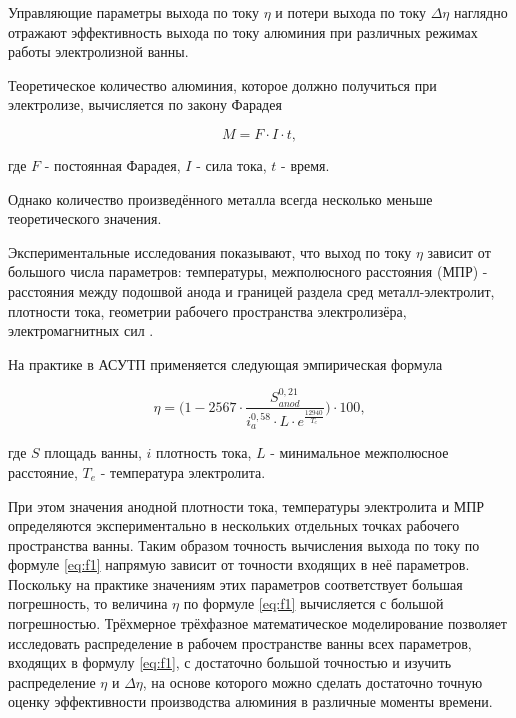 \documentclass[]{pmi}
\begin{document}

Управляющие параметры выхода по току $\eta$ и потери выхода по току $\Delta \eta$ наглядно отражают эффективность выхода по току алюминия при различных режимах работы электролизной ванны.

Теоретическое количество алюминия, которое должно получиться при электролизе, вычисляется по закону Фарадея

\begin{equation}\label{eq:farad}
M = F \cdot I \cdot t,
\end{equation}

где $F$ - постоянная Фарадея, $I$ - сила тока, $t$ - время.

Однако количество произведённого металла всегда несколько меньше теоретического значения.

Экспериментальные исследования показывают, что выход по току $\eta$ зависит от большого числа параметров: температуры, межполюсного расстояния (МПР) - расстояния между подошвой анода и границей раздела сред металл-электролит, плотности тока, геометрии рабочего пространства электролизёра, электромагнитных сил \cite{litlink:belo}.

На практике в АСУТП применяется следующая эмпирическая формула \cite{litlink:derkach2}

\begin{equation}\label{eq:f1}
\eta = \bigg(1-2567 \cdot \frac{S^{0,21}_{anod}}{i^{0,58}_{a}\cdot L \cdot e^{\frac{12940}{T_e}}}\bigg) \cdot 100,
\end{equation}

где $S$ площадь ванны, $i$ плотность тока, $L$ - минимальное межполюсное расстояние, $T_e$ - температура электролита.

При этом значения анодной плотности тока, температуры электролита и МПР определяются экспериментально в нескольких отдельных точках рабочего пространства ванны.
Таким образом точность вычисления выхода по току по формуле \ref{eq:f1} напрямую зависит от точности входящих в неё параметров. Поскольку на практике значениям этих параметров соответствует большая погрешность, то величина $\eta$ по формуле \ref{eq:f1} вычисляется с большой погрешностью. Трёхмерное трёхфазное математическое моделирование \cite{litlink:kalmykov} позволяет исследовать распределение в рабочем пространстве ванны всех параметров, входящих в формулу \ref{eq:f1}, с достаточно большой точностью и изучить распределение $\eta$ и $\Delta\eta$, на основе которого можно сделать достаточно точную оценку эффективности производства алюминия в различные моменты времени.
\end{document}
